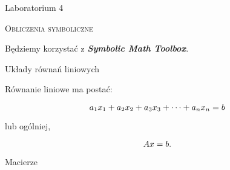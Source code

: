 \documentclass[12pt]{amsbook}
\theoremstyle{definition}
\begin{document}
\begin{center}
\large{Laboratorium 4}\\
\end{center}



\begin{center}
\textsc{Obliczenia symboliczne}\\
\end{center}

Będziemy korzystać z \textit{\textbf{Symbolic Math Toolbox}}.\\

\begin{center}
Układy równań liniowych\\
\end{center}

Równanie liniowe ma postać:

$$a_1x_1 + a_2x_2 + a_3x_3 + \cdots + a_nx_n = b\\$$

lub ogólniej,

$$Ax=b.\\$$


\begin{center}
Macierze\\
\end{center}
\end{document}
